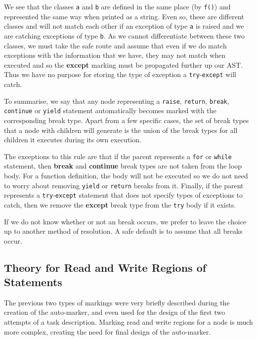 \documentclass[twoside,a4paper]{report}
\begin{document}
\pagebreak



We see that the classes \texttt{a} and \texttt{b} are defined in the same place (by \texttt{f()}) and represented the same way when printed as a string. Even
so, these are different classes and will not match each other if an exception of type \texttt{a} is raised and we are catching exceptions of type \texttt{b}.
As we cannot differentiate between these two classes, we must take the safe route and assume that even if we do match exceptions with the information that we
have, they may not match when executed and so the \textbf{except} marking must be propagated further up our AST. Thus we have no purpose for storing the type
of exception a \texttt{try}-\texttt{except} will catch.

To summarise, we say that any node representing a \texttt{raise}, \texttt{return}, \texttt{break}, \texttt{continue} or \texttt{yield} statement automatically
becomes marked with the corresponding break type. Apart from a few specific cases, the set of break types that a node with children will generate is the union
of the break types for all children it executes during its own execution.

The exceptions to this rule are that if the parent represents a \texttt{for} or \texttt{while} statement, then \textbf{break} and \textbf{continue} break types
are not taken from the loop body. For a function definition, the body will not be executed so we do not need to worry about removing \texttt{yield} or
\texttt{return} breaks from it. Finally, if the parent represents a \texttt{try}-\texttt{except} statement that does not specify types of exceptions to catch,
then we remove the \textbf{except} break type from the \texttt{try} body if it exists.

If we do not know whether or not an break occurs, we prefer to leave the choice up to another method of resolution. A safe default is to assume that all breaks occur.

\subsection{Theory for Read and Write Regions of Statements}

The previous two types of markings were very briefly described during the creation of the auto-marker, and even used for the design of the first two attempts of
a task description. Marking read and write regions for a node is much more complex, creating the need for final design of the auto-marker.
\end{document}
